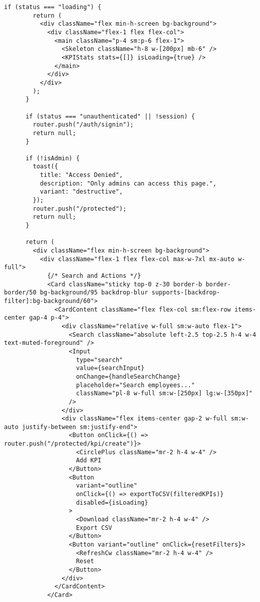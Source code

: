 \begin{lstlisting}[language=Golang, caption=Routes, frame=single]
      if (status === "loading") {
        return (
          <div className="flex min-h-screen bg-background">
            <div className="flex-1 flex flex-col">
              <main className="p-4 sm:p-6 flex-1">
                <Skeleton className="h-8 w-[200px] mb-6" />
                <KPIStats stats={[]} isLoading={true} />
              </main>
            </div>
          </div>
        );
      }
    
      if (status === "unauthenticated" || !session) {
        router.push("/auth/signin");
        return null;
      }
    
      if (!isAdmin) {
        toast({
          title: "Access Denied",
          description: "Only admins can access this page.",
          variant: "destructive",
        });
        router.push("/protected");
        return null;
      }
    
      return (
        <div className="flex min-h-screen bg-background">
          <div className="flex-1 flex flex-col max-w-7xl mx-auto w-full">
            {/* Search and Actions */}
            <Card className="sticky top-0 z-30 border-b border-border/50 bg-background/95 backdrop-blur supports-[backdrop-filter]:bg-background/60">
              <CardContent className="flex flex-col sm:flex-row items-center gap-4 p-4">
                <div className="relative w-full sm:w-auto flex-1">
                  <Search className="absolute left-2.5 top-2.5 h-4 w-4 text-muted-foreground" />
                  <Input
                    type="search"
                    value={searchInput}
                    onChange={handleSearchChange}
                    placeholder="Search employees..."
                    className="pl-8 w-full sm:w-[250px] lg:w-[350px]"
                  />
                </div>
                <div className="flex items-center gap-2 w-full sm:w-auto justify-between sm:justify-end">
                  <Button onClick={() => router.push("/protected/kpi/create")}>
                    <CirclePlus className="mr-2 h-4 w-4" />
                    Add KPI
                  </Button>
                  <Button
                    variant="outline"
                    onClick={() => exportToCSV(filteredKPIs)}
                    disabled={isLoading}
                  >
                    <Download className="mr-2 h-4 w-4" />
                    Export CSV
                  </Button>
                  <Button variant="outline" onClick={resetFilters}>
                    <RefreshCw className="mr-2 h-4 w-4" />
                    Reset
                  </Button>
                </div>
              </CardContent>
            </Card>
    

\end{lstlisting}
